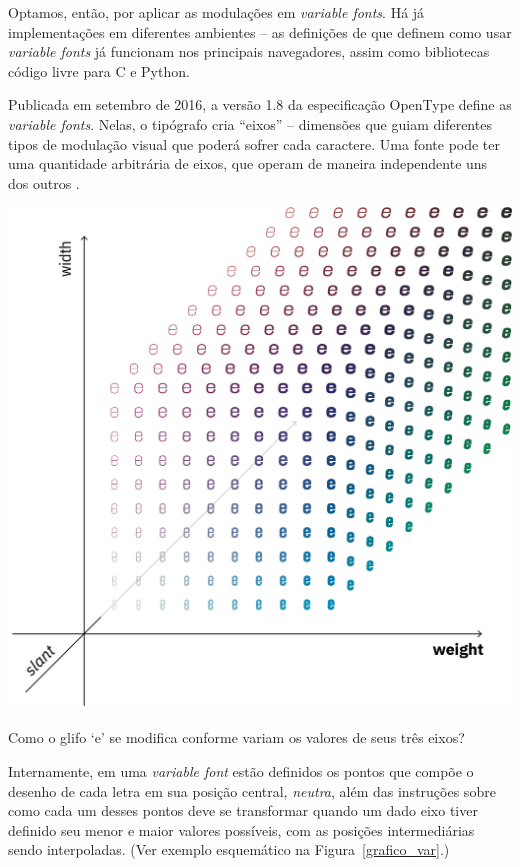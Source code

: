 \documentclass[a4paper]{tufte-handout}
\newcommand{\textls}[2][5]{%
    \begingroup\addfontfeatures{LetterSpace=#1}#2\endgroup
  }
\renewcommand{\smallcapsspacing}[1]{\textls[10]{#1}}
\renewcommand{\textsc}[1]{\smallcapsspacing{\textsmallcaps{#1}}}
\begin{document}
Optamos, então, por aplicar as modulações em \textit{variable fonts}. Há já implementações em diferentes ambientes -- as definições de \textsc{css} que definem como usar \textit{variable fonts} já funcionam nos principais navegadores, assim como  bibliotecas código livre para C e Python.

Publicada em setembro de 2016, a versão 1.8 da especificação OpenType define as \textit{variable fonts}. Nelas, o tipógrafo cria ``eixos'' -- dimensões que guiam diferentes tipos de modulação visual que poderá sofrer cada caractere. Uma fonte pode ter uma quantidade arbitrária de eixos, que operam de maneira independente uns dos outros \citep{varfontssepcs}. 

\begin{marginfigure}
  \includegraphics{imgs/grafico-var.png}
  \caption{Como o glifo `e' se modifica conforme variam os valores de seus três eixos?}
  \label{grafico_var}
\end{marginfigure}
    
Internamente, em uma \textit{variable font} estão definidos os pontos que compõe o desenho de cada letra em sua posição central, \textit{neutra}, além das instruções sobre como cada um desses pontos deve se transformar quando um dado eixo tiver definido seu menor e maior valores possíveis, com as posições intermediárias sendo interpoladas. (Ver exemplo esquemático na Figura~\ref{grafico_var}.)
    
\end{document}
